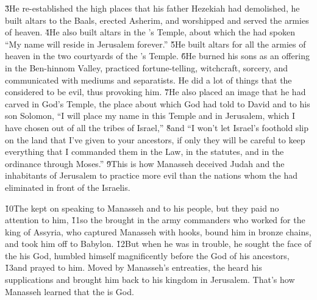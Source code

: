 \v{3}He re-established the high places that his father Hezekiah had demolished, he built altars to the Baals, erected Asherim, and worshipped and served the armies of heaven. \v{4}He also built altars in the 's Temple, about which the  had spoken ``My name will reside in Jerusalem forever.'' \v{5}He built altars for all the armies of heaven in the two courtyards of the 's Temple. \v{6}He burned his sons as an offering in the Ben-hinnom Valley, practiced fortune-telling, witchcraft, sorcery, and communicated with mediums and separatists. He did a lot of things that the  considered to be evil, thus provoking him. \v{7}He also placed an image that he had carved in God's Temple, the place about which God had told to David and to his son Solomon, ``I will place my name in this Temple and in Jerusalem, which I have chosen out of all the tribes of Israel,'' \v{8}and ``I won't let Israel's foothold slip on the land that I've given to your ancestors, if only they will be careful to keep everything that I commanded them in the Law, in the statutes, and in the ordinance through Moses.'' \v{9}This is how Manasseh deceived Judah and the inhabitants of Jerusalem to practice more evil than the nations whom the  had eliminated in front of the Israelis.

\v{10}The  kept on speaking to Manasseh and to his people, but they paid no attention to him, \v{11}so the  brought in the army commanders who worked for the king of Assyria, who captured Manasseh with hooks, bound him in bronze chains, and took him off to Babylon. \v{12}But when he was in trouble, he sought the face of the  his God, humbled himself magnificently before the God of his ancestors, \v{13}and prayed to him. Moved by Manasseh's entreaties, the  heard his supplications and brought him back to his kingdom in Jerusalem. That's how Manasseh learned that the  is God.

